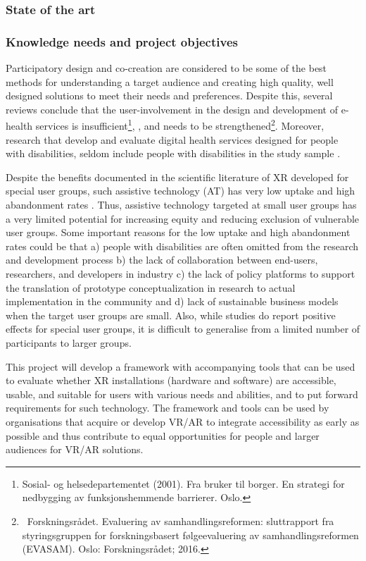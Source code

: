 
\subsubsection{State of the art}

\subsubsection{Knowledge needs and project objectives}
Participatory design and co-creation are considered to be some of the best methods for understanding a target audience
and creating high quality, well designed solutions to meet their needs and preferences. Despite this, several reviews
conclude that the user-involvement in the design and development of e-health services is
insufficient\footnote{Sosial- og helsedepartementet (2001). Fra bruker til borger. En strategi for nedbygging av
funksjonshemmende barrierer. Oslo.}, \autocite{manzoorEservicesSocialInclusion2017a}, and needs to be strengthened\footnote{\ Forskningsrådet. Evaluering av
samhandlingsreformen: sluttrapport fra styringsgruppen for forskningsbasert følgeevaluering av samhandlingsreformen
(EVASAM). Oslo: Forskningsrådet; 2016.}. Moreover, research that develop and evaluate digital health services designed
for people with disabilities, seldom include people with disabilities in the study sample \autocite{10.3389/fpsyg.2018.02323,10.1007/978-3-319-58634-2_15}.

Despite the benefits documented in the scientific literature of XR developed for special user groups, such assistive
technology (AT) has very low uptake and high abandonment rates \autocite{schererWhyPeopleUse2015}.
Thus, assistive technology targeted at small user groups has a very limited potential for increasing equity and
reducing exclusion of vulnerable user groups. Some important reasons for the low uptake and high abandonment rates
could be that a) people with disabilities are often omitted from the research and development process b) the lack of
collaboration between end-users, researchers, and developers in industry c) the lack of policy platforms to support the
translation of prototype conceptualization in research to actual implementation in the community and d) lack of
sustainable business models when the target user groups are small. Also, while studies do report positive effects for
special user groups, it is difficult to generalise from a limited number of participants to larger groups. 

This project will develop a framework with accompanying tools that can be used to evaluate whether XR installations
(hardware and software) are accessible, usable, and suitable for users with various needs and abilities, and to put
forward requirements for such technology. The framework and tools can be used by organisations that acquire or develop
VR/AR to integrate accessibility as early as possible and thus contribute to equal opportunities for people and larger
audiences for VR/AR solutions.

